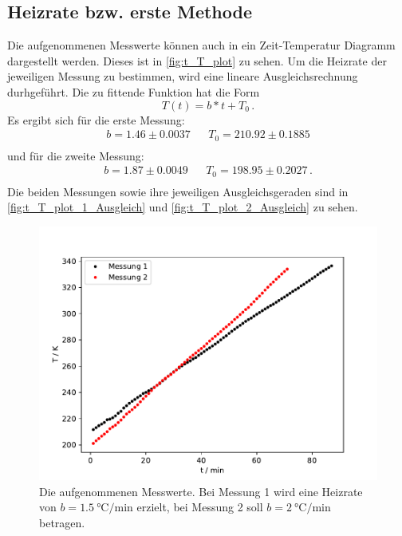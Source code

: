 \subsection{Heizrate bzw. erste Methode}

Die aufgenommenen Messwerte können auch in ein Zeit-Temperatur Diagramm dargestellt werden.
Dieses ist in \autoref{fig:t_T_plot} zu sehen.
Um die Heizrate der jeweiligen Messung zu bestimmen, wird eine lineare Ausgleichsrechnung durhgeführt.
Die zu fittende Funktion hat die Form
\begin{equation*}
  T(t) = b * t + T_0 \, .
\end{equation*}
Es ergibt sich für die erste Messung:
\begin{align*}
  b = 1.46 \pm  0.0037 &&  T_0 = 210.92 \pm 0.1885\\
\end{align*}
und für die zweite Messung:
\begin{align*}
  b =  1.87 \pm 0.0049  &&  T_0 = 198.95 \pm  0.2027 \, . \\
\end{align*}
Die beiden Messungen sowie ihre jeweiligen Ausgleichsgeraden sind in \autoref{fig:t_T_plot_1_Ausgleich} und \autoref{fig:t_T_plot_2_Ausgleich} zu sehen.

\begin{figure}
  \centering
  \includegraphics{build/zeit_temp.pdf}
  \caption{Die aufgenommenen Messwerte. Bei Messung 1 wird eine Heizrate von $b = \SI{1.5}{\celsius\per\minute}$ erzielt, 
  bei Messung 2 soll $b = \SI{2}{\celsius\per\minute}$ betragen.}
  \label{fig:t_T_plot}
\end{figure} %

